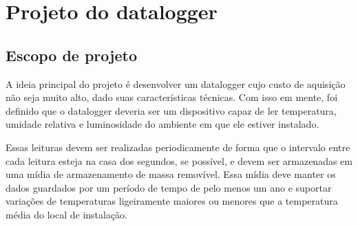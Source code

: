 \chapter{Projeto do datalogger}
\label{chap:metodologia}



\section{Escopo de projeto}




A ideia principal do projeto é desenvolver um datalogger cujo custo de aquisição não seja muito alto, dado suas características técnicas. Com isso em mente, foi definido que o datalogger deveria ser um dispositivo capaz de ler temperatura, umidade relativa e luminosidade do ambiente em que ele estiver instalado. 

Essas leituras devem ser realizadas periodicamente de forma que o intervalo entre cada leitura esteja na casa dos segundos, se possível, e devem ser armazenadas em uma mídia de armazenamento de massa removível. Essa mídia deve manter os dados guardados por um período de tempo  de pelo menos um ano e suportar variações de temperaturas ligeiramente maiores ou menores que a temperatura média do local de instalação.


